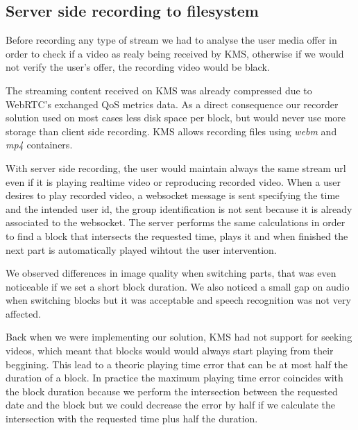 \subsection{Server side recording to filesystem}

	Before recording any type of stream we had to analyse the user media offer in order to check if a video as realy being received by \ac{KMS}, otherwise if we would not verify the user's offer, the recording video would be black.

	The streaming content received on \ac{KMS} was already compressed due to \ac{WebRTC}'s exchanged \ac{QoS} metrics data. As a direct consequence our recorder solution used on most cases less disk space per block, but would never use more storage than client side recording. \ac{KMS} allows recording files using \emph{webm} and \emph{mp4} containers.

	With server side recording, the user would maintain always the same stream url even if it is playing realtime video or reproducing recorded video. When a user desires to play recorded video, a websocket message is sent specifying the time and the intended user id, the group identification is not sent because it is already associated to the websocket. The server performs the same calculations in order to find a block that intersects the requested time, plays it and when finished the next part is automatically played wihtout the user intervention.

	We observed differences in image quality when switching parts, that was even noticeable if we set a short block duration. We also noticed a small gap on audio when switching blocks but it was acceptable and speech recognition was not very affected. 

	Back when we were implementing our solution, \ac{KMS} had not support for seeking videos, which meant that blocks would would always start playing from their beggining. This lead to a theoric playing time error that can be at most half the duration of a block. In practice the maximum playing time error coincides with the block duration because we perform the intersection between the requested date and the block but we could decrease the error by half if we calculate the intersection with the requested time plus half the duration. 

